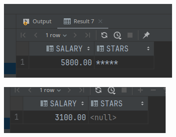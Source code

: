 \documentclass[11pt]{article}
\begin{document}
\begin{enumerate}
\begin{enumerate}
\begin{center}
\includegraphics[width=.9\linewidth]{./resources/new_emps1.png}
\end{center}

\begin{center}
\includegraphics[width=.9\linewidth]{./resources/new_emps2.png}
\end{center}
\end{enumerate}
\end{enumerate}
\end{document}
